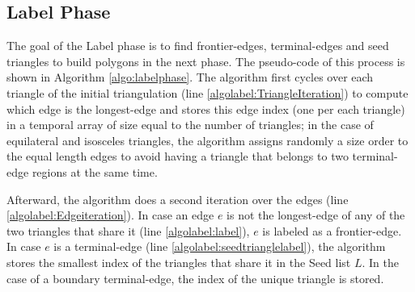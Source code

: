 \documentclass[lineno,pdflatex,sn-mathphys]{sn-jnl}%
\theoremstyle{thmstyleone}%
\theoremstyle{thmstyletwo}%
\theoremstyle{thmstylethree}%
\begin{document}
\subsection{Label Phase}
\label{subsec:Labelpohase}

The goal of the Label phase  is to find  frontier-edges, terminal-edges and seed  triangles to build polygons in the next phase. The pseudo-code of this process is shown in Algorithm \ref{algo:labelphase}.
The algorithm first cycles over each triangle  of the initial triangulation (line \ref{algolabel:TriangleIteration}) to compute which edge is the longest-edge and stores this edge index (one per each triangle)  in a temporal array of size equal to the number of triangles; in the case of equilateral and isosceles triangles, the algorithm assigns  randomly a size order to the equal length edges  to avoid having a triangle that belongs to two terminal-edge regions at the same time. %


Afterward, the algorithm does a second iteration over the edges (line \ref{algolabel:Edgeiteration}). In case  an edge $e$ is not the longest-edge of any of the two triangles that share it (line \ref{algolabel:label}), $e$ is labeled as a frontier-edge. In case $e$ is a terminal-edge (line \ref{algolabel:seedtrianglelabel}), the algorithm stores the  smallest index of the triangles that share it in the Seed list $L$. In the case of a boundary terminal-edge, the index of the unique triangle is  stored. 
\end{document}
